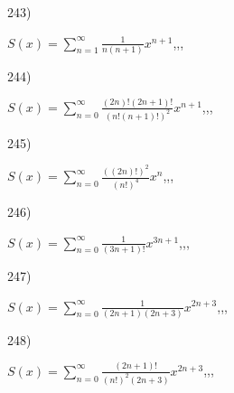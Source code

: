 \documentclass[11pt, ukrainian]{article}
\begin{document}
\par
\vspace{0.9cm}
243) \space 
{%
{$S(x)=\sum\limits_{n=1}^{\infty}{\frac{1}{n(n+1)}}{x^{{n+1}}}$},,, \par \smallskip  
}
\par
\vspace{0.9cm}
244) \space 
{%
{$S(x)=\sum\limits_{n=0}^{\infty}{\frac{(2n)!(2n+1)!}{(n!(n+1)!)^2}}{x^{{n+1}}}$},,, \par \smallskip  
}
\par
\vspace{0.9cm}
245) \space 
{%
{$S(x)=\sum\limits_{n=0}^{\infty}{\frac{((2n)!)^2}{(n!)^4}}{x^{{n}}}$},,, \par \smallskip  
}
\par
\vspace{0.9cm}
246) \space 
{%
{$S(x)=\sum\limits_{n=0}^{\infty}{\frac{1}{(3n+1)!}}{x^{{3n+1}}}$},,, \par \smallskip  
}
\par
\vspace{0.9cm}
247) \space 
{%
{$S(x)=\sum\limits_{n=0}^{\infty}{\frac{1}{(2n+1)(2n+3)}}{x^{{2n+3}}}$},,, \par \smallskip  
}
\par
\vspace{0.9cm}
248) \space 
{%
{$S(x)=\sum\limits_{n=0}^{\infty}{\frac{(2n+1)!}{(n!)^2(2n+3)}}{x^{{2n+3}}}$},,, \par \smallskip  
}
\end{document}
